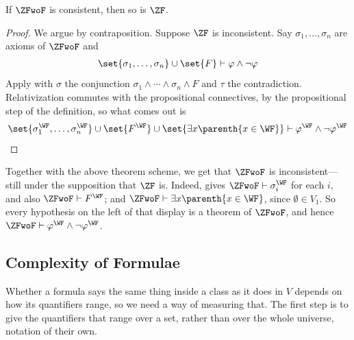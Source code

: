 \begin{boxcorollary}
    If $\ZFwoF$ is consistent, then so is $\ZF$.
\end{boxcorollary}
\begin{proof}
    We argue by contraposition. Suppose $\ZF$ is inconsistent. Say $\sigma_1, \ldots, \sigma_n$ are axioms of $\ZFwoF$ and
    \begin{align*}
        \set{\sigma_1, \ldots, \sigma_n} \cup \set{F} \vdash \varphi \land \neg\varphi
    \end{align*}
    Apply  with $\sigma$ the conjunction $\sigma_1 \land \cdots \land \sigma_n \land F$ and $\tau$ the contradiction. Relativization commutes with the propositional connectives, by the propositional step of the definition, so what comes out is
    \begin{align*}
        \set{\sigma_1^{\WF}, \ldots, \sigma_n^{\WF}} \cup \set{F^{\WF}} \cup \set{\exists x \parenth{x \in \WF}} \vdash \varphi^{\WF} \land \neg \varphi^{\WF}
    \end{align*}
\end{proof}

Together with the above theorem scheme, we get that $\ZFwoF$ is inconsistent---still under the supposition that $\ZF$ is. Indeed,  gives $\ZFwoF \vdash \sigma_i^{\WF}$ for each $i$, and also $\ZFwoF \vdash F^{\WF}$; and $\ZFwoF \vdash \exists x \parenth{x \in \WF}$, since $\emptyset \in V_1$. So every hypothesis on the left of that display is a theorem of $\ZFwoF$, and hence $\ZFwoF \vdash \varphi^{\WF} \land \neg\varphi^{\WF}$.

\subsection{Complexity of Formulae}

Whether a formula says the same thing inside a class as it does in $V$ depends on how its quantifiers range, so we need a way of measuring that. The first step is to give the quantifiers that range over a set, rather than over the whole universe, notation of their own.

